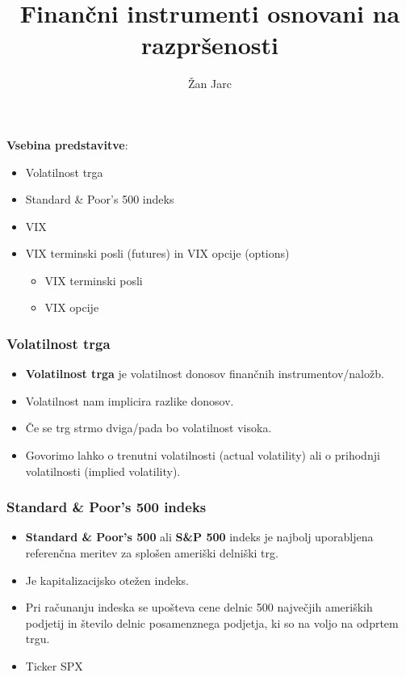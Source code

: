 \documentclass[10pt]{beamer}
\begin{document}
\title[Finančni instrumenti osnovani na razpršenosti]{Finančni instrumenti osnovani na razpršenosti}
\author{Žan Jarc}

\begin{frame}
	\titlepage
\end {frame}

\begin{frame}
\textbf{Vsebina predstavitve}:
	\begin{itemize}
		\item Volatilnost trga
		\item Standard \& Poor’s 500 indeks
		\item VIX
		\item VIX terminski posli (futures) in VIX opcije (options)
			\begin{itemize}
				\item VIX terminski posli
				\item VIX opcije
			\end{itemize}
	\end{itemize}
\end {frame}

\begin{frame}
\frametitle{Volatilnost trga}
\begin{itemize}
\item \textbf{Volatilnost trga} je volatilnost donosov finančnih instrumentov/naložb.

\item Volatilnost nam implicira razlike donosov.

\item Če se trg strmo dviga/pada bo volatilnost visoka.
\item Govorimo lahko o trenutni volatilnosti (actual volatility) ali o prihodnji volatilnosti (implied volatility).
\end{itemize}
\end{frame}

\begin{frame}
\frametitle{Standard \& Poor’s 500 indeks}
\begin{itemize}
\item \textbf{Standard \& Poor’s 500} ali \textbf{S\&P 500} indeks je najbolj uporabljena referenčna meritev za splošen ameriški delniški trg.
\item Je kapitalizacijsko otežen indeks. 
\item Pri računanju indeska se upošteva cene delnic 500 največjih ameriških podjetij in število delnic posamenznega podjetja, ki so na voljo na odprtem trgu.
\item Ticker SPX

\end{itemize}
\end{frame}
\end{document}

